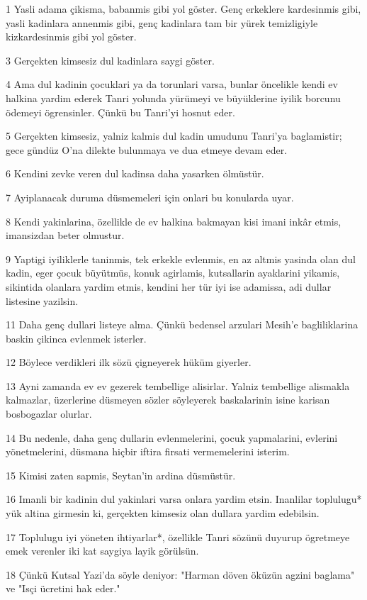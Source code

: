 \par 1 Yasli adama çikisma, babanmis gibi yol göster. Genç erkeklere kardesinmis gibi, yasli kadinlara annenmis gibi, genç kadinlara tam bir yürek temizligiyle kizkardesinmis gibi yol göster.
\par 3 Gerçekten kimsesiz dul kadinlara saygi göster.
\par 4 Ama dul kadinin çocuklari ya da torunlari varsa, bunlar öncelikle kendi ev halkina yardim ederek Tanri yolunda yürümeyi ve büyüklerine iyilik borcunu ödemeyi ögrensinler. Çünkü bu Tanri'yi hosnut eder.
\par 5 Gerçekten kimsesiz, yalniz kalmis dul kadin umudunu Tanri'ya baglamistir; gece gündüz O'na dilekte bulunmaya ve dua etmeye devam eder.
\par 6 Kendini zevke veren dul kadinsa daha yasarken ölmüstür.
\par 7 Ayiplanacak duruma düsmemeleri için onlari bu konularda uyar.
\par 8 Kendi yakinlarina, özellikle de ev halkina bakmayan kisi imani inkâr etmis, imansizdan beter olmustur.
\par 9 Yaptigi iyiliklerle taninmis, tek erkekle evlenmis, en az altmis yasinda olan dul kadin, eger çocuk büyütmüs, konuk agirlamis, kutsallarin ayaklarini yikamis, sikintida olanlara yardim etmis, kendini her tür iyi ise adamissa, adi dullar listesine yazilsin.
\par 11 Daha genç dullari listeye alma. Çünkü bedensel arzulari Mesih'e bagliliklarina baskin çikinca evlenmek isterler.
\par 12 Böylece verdikleri ilk sözü çigneyerek hüküm giyerler.
\par 13 Ayni zamanda ev ev gezerek tembellige alisirlar. Yalniz tembellige alismakla kalmazlar, üzerlerine düsmeyen sözler söyleyerek baskalarinin isine karisan bosbogazlar olurlar.
\par 14 Bu nedenle, daha genç dullarin evlenmelerini, çocuk yapmalarini, evlerini yönetmelerini, düsmana hiçbir iftira firsati vermemelerini isterim.
\par 15 Kimisi zaten sapmis, Seytan'in ardina düsmüstür.
\par 16 Imanli bir kadinin dul yakinlari varsa onlara yardim etsin. Inanlilar toplulugu* yük altina girmesin ki, gerçekten kimsesiz olan dullara yardim edebilsin.
\par 17 Toplulugu iyi yöneten ihtiyarlar*, özellikle Tanri sözünü duyurup ögretmeye emek verenler iki kat saygiya layik görülsün.
\par 18 Çünkü Kutsal Yazi'da söyle deniyor: "Harman döven öküzün agzini baglama" ve "Isçi ücretini hak eder."
